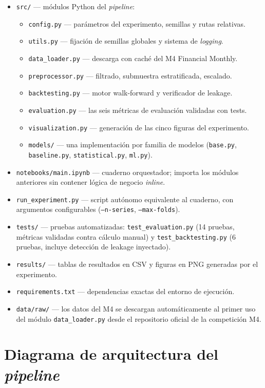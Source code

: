 \begin{itemize}
  \item \texttt{src/} — módulos Python del \textit{pipeline}:
    \begin{itemize}
      \item \texttt{config.py} — parámetros del experimento, semillas y rutas relativas.
      \item \texttt{utils.py} — fijación de semillas globales y sistema de \textit{logging}.
      \item \texttt{data\_loader.py} — descarga con caché del M4 Financial Monthly.
      \item \texttt{preprocessor.py} — filtrado, submuestra estratificada, escalado.
      \item \texttt{backtesting.py} — motor walk-forward y verificador de leakage.
      \item \texttt{evaluation.py} — las seis métricas de evaluación validadas con tests.
      \item \texttt{visualization.py} — generación de las cinco figuras del experimento.
      \item \texttt{models/} — una implementación por familia de modelos (\texttt{base.py}, \texttt{baseline.py}, \texttt{statistical.py}, \texttt{ml.py}).
    \end{itemize}
  \item \texttt{notebooks/main.ipynb} — cuaderno orquestador; importa los módulos anteriores sin contener lógica de negocio \textit{inline}.
  \item \texttt{run\_experiment.py} — script autónomo equivalente al cuaderno, con argumentos configurables (\texttt{--n-series}, \texttt{--max-folds}).
  \item \texttt{tests/} — pruebas automatizadas: \texttt{test\_evaluation.py} (14 pruebas, métricas validadas contra cálculo manual) y \texttt{test\_backtesting.py} (6 pruebas, incluye detección de leakage inyectado).
  \item \texttt{results/} — tablas de resultados en CSV y figuras en PNG generadas por el experimento.
  \item \texttt{requirements.txt} — dependencias exactas del entorno de ejecución.
  \item \texttt{data/raw/} — los datos del M4 se descargan automáticamente al primer uso del módulo \texttt{data\_loader.py} desde el repositorio oficial de la competición M4.
\end{itemize}

\section*{Diagrama de arquitectura del \textit{pipeline}}


